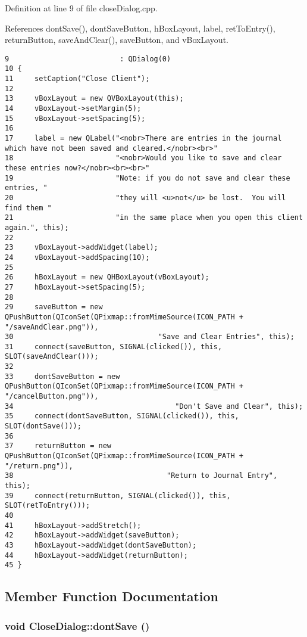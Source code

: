 Definition at line 9 of file close\-Dialog.cpp.

References dont\-Save(), dont\-Save\-Button, h\-Box\-Layout, label, ret\-To\-Entry(), return\-Button, save\-And\-Clear(), save\-Button, and v\-Box\-Layout.

\footnotesize\begin{verbatim}9                          : QDialog(0)
10 {
11     setCaption("Close Client");
12 
13     vBoxLayout = new QVBoxLayout(this);
14     vBoxLayout->setMargin(5);
15     vBoxLayout->setSpacing(5);
16 
17     label = new QLabel("<nobr>There are entries in the journal which have not been saved and cleared.</nobr><br>"
18                        "<nobr>Would you like to save and clear these entries now?</nobr><br><br>"
19                        "Note: if you do not save and clear these entries, "
20                        "they will <u>not</u> be lost.  You will find them "
21                        "in the same place when you open this client again.", this);
22 
23     vBoxLayout->addWidget(label);
24     vBoxLayout->addSpacing(10);
25 
26     hBoxLayout = new QHBoxLayout(vBoxLayout);
27     hBoxLayout->setSpacing(5);
28 
29     saveButton = new QPushButton(QIconSet(QPixmap::fromMimeSource(ICON_PATH + "/saveAndClear.png")),
30                                  "Save and Clear Entries", this);
31     connect(saveButton, SIGNAL(clicked()), this, SLOT(saveAndClear()));
32 
33     dontSaveButton = new QPushButton(QIconSet(QPixmap::fromMimeSource(ICON_PATH + "/cancelButton.png")),
34                                      "Don't Save and Clear", this);
35     connect(dontSaveButton, SIGNAL(clicked()), this, SLOT(dontSave()));
36 
37     returnButton = new QPushButton(QIconSet(QPixmap::fromMimeSource(ICON_PATH + "/return.png")),
38                                    "Return to Journal Entry", this);
39     connect(returnButton, SIGNAL(clicked()), this, SLOT(retToEntry()));
40 
41     hBoxLayout->addStretch();
42     hBoxLayout->addWidget(saveButton);
43     hBoxLayout->addWidget(dontSaveButton);
44     hBoxLayout->addWidget(returnButton);
45 }
\end{verbatim}\normalsize 




\subsection{Member Function Documentation}
\hypertarget{classCloseDialog_k1}{
\subsubsection[dontSave]{\setlength{\rightskip}{0pt plus 5cm}void Close\-Dialog::dont\-Save ()}}
\label{classCloseDialog_k1}


